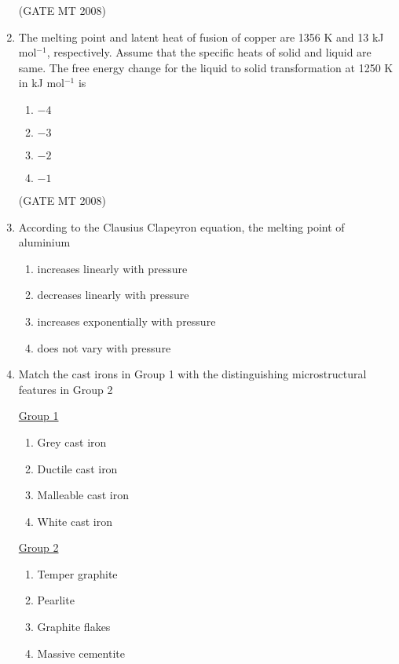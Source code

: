 \documentclass[11pt, letterpaper]{article}
\theoremstyle{remark}
\begin{document}
\begin{enumerate}
\hfill(GATE MT 2008) 
\item The melting point and latent heat of fusion of copper are 1356 K and 13 kJ mol$^{-1}$, respectively. 
Assume that the specific heats of solid and liquid are same. 
The free energy change for the liquid to solid transformation at 1250 K in kJ mol$^{-1}$ is

\begin{multicols}{4}
\begin{enumerate} 
\item $-4$
\item $-3$
\item $-2$
\item $-1$
\end{enumerate}
\end{multicols}

\hfill(GATE MT 2008) 

\item According to the Clausius Clapeyron equation, the melting point of aluminium

\begin{multicols}{2}
\begin{enumerate} 
\item increases linearly with pressure
\item decreases linearly with pressure
\item increases exponentially with pressure
\item does not vary with pressure
\end{enumerate}
\end{multicols}

\item Match the cast irons in Group 1 with the distinguishing microstructural features in Group 2
\begin{multicols}{2}
\underline{Group 1}
\begin{enumerate}[label=(\Alph*), start=16]
\item Grey cast iron
\item Ductile cast iron  
\item Malleable cast iron
\item White cast iron
\end{enumerate}

\underline{Group 2}
\begin{enumerate}[label=(\arabic*), start=1]
\item Temper graphite
\item Pearlite
\item Graphite flakes  
\item Massive cementite
\end{enumerate}
\end{multicols}


\end{enumerate}
\end{document}
